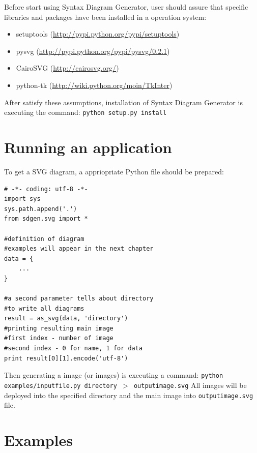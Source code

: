 \documentclass[12pt,a4paper]{article}
\newcommand{\chapter}[1]{\section*{\Large#1}\setcounter{section}{0}}
\begin{document}
Before start using Syntax Diagram Generator, user should assure that specific libraries and packages have been installed in a operation system:

\begin{itemize}
\item setuptools (\url{http://pypi.python.org/pypi/setuptools})
\item pysvg (\url{http://pypi.python.org/pypi/pysvg/0.2.1})
\item CairoSVG (\url{http://cairosvg.org/})
\item python-tk (\url{http://wiki.python.org/moin/TkInter})
\end{itemize} 

\noindent
After satisfy these assumptions, installation of Syntax Diagram Generator is executing the command:
\newline
\newline
\texttt{python setup.py install}
\section{Running an application}

To get a SVG diagram, a appriopriate Python file should be prepared:

\begin{lstlisting}[caption={Example of input Python file}]
# -*- coding: utf-8 -*-
import sys
sys.path.append('.')
from sdgen.svg import *

#definition of diagram
#examples will appear in the next chapter
data = {
	...
}

#a second parameter tells about directory
#to write all diagrams
result = as_svg(data, 'directory')
#printing resulting main image
#first index - number of image
#second index - 0 for name, 1 for data
print result[0][1].encode('utf-8')
\end{lstlisting}

\noindent
Then generating a image (or images) is executing a command:
\newline
\newline
\texttt{python examples/inputfile.py directory $>$ outputimage.svg}
\newline
\newline
All images will be deployed into the specified directory and the main image into \texttt{outputimage.svg} file.

\chapter{Examples}
\end{document}
